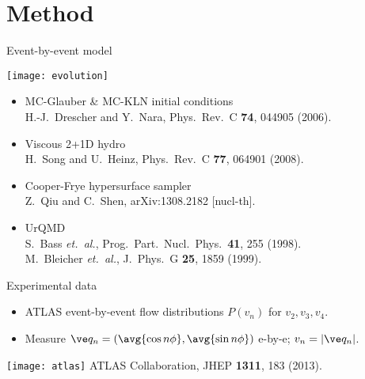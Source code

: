 \documentclass{beamer}
\begin{document}
\section{Method}


\begin{frame}{Event-by-event model}
  \begin{center}
    \texttt{[image: evolution]}
  \end{center}

  \begin{itemize}
    \item MC-Glauber \& MC-KLN initial conditions \\
      \hspace{1em} {\tiny H.-J.\ Drescher and Y.\ Nara, Phys.\ Rev.\ C {\bf 74}, 044905 (2006).}
    \item Viscous 2+1D hydro \\
      \hspace{1em} {\tiny H.\ Song and U.\ Heinz, Phys.\ Rev.\ C {\bf 77}, 064901 (2008).}
    \item Cooper-Frye hypersurface sampler \\
      \hspace{1em} {\tiny Z.\ Qiu and C.\ Shen, arXiv:1308.2182 [nucl-th].}
    \item UrQMD \\
      \hspace{1em} {\tiny S.\ Bass \emph{et.\ al.}, Prog.\ Part.\ Nucl.\ Phys.\  {\bf 41}, 255 (1998).} \\[-1ex]
      \hspace{1em} {\tiny M.\ Bleicher \emph{et.\ al.}, J.\ Phys.\ G {\bf 25}, 1859 (1999).}
  \end{itemize}

\end{frame}




\begin{frame}[label=atlas]{Experimental data}
  \begin{itemize}
    \item ATLAS event-by-event flow distributions $P(v_n)$ for $v_2,v_3,v_4$.
    \item Measure $\ve q_n = (\avg{\cos n\phi}, \avg{\sin n\phi})$ e-by-e; $v_n = |\ve q_n|$.
  \end{itemize}
  
  \vspace{3ex}

  \texttt{[image: atlas]}
  \flushright \tiny ATLAS Collaboration, JHEP {\bf 1311}, 183 (2013).
\end{frame}
\end{document}
